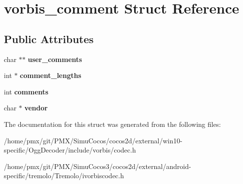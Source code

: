 \hypertarget{structvorbis__comment}{}\section{vorbis\+\_\+comment Struct Reference}
\label{structvorbis__comment}
\subsection*{Public Attributes}
\begin{DoxyCompactItemize}
\item 
\mbox{\label{structvorbis__comment_a9e36acca53d6be43e8218fb9ee49d850}} 
char $\ast$$\ast$ {\bfseries user\+\_\+comments}
\item 
\mbox{\label{structvorbis__comment_a91e786c2110af999dba5538b7b5cb04c}} 
int $\ast$ {\bfseries comment\+\_\+lengths}
\item 
\mbox{\label{structvorbis__comment_aa338208fb0f485b3818832a7d07dbe92}} 
int {\bfseries comments}
\item 
\mbox{\label{structvorbis__comment_ab2646bee68d539413329b8eead133d35}} 
char $\ast$ {\bfseries vendor}
\end{DoxyCompactItemize}


The documentation for this struct was generated from the following files\+:\begin{DoxyCompactItemize}
\item 
/home/pmx/git/\+P\+M\+X/\+Simu\+Cocos/cocos2d/external/win10-\/specific/\+Ogg\+Decoder/include/vorbis/codec.\+h\item 
/home/pmx/git/\+P\+M\+X/\+Simu\+Cocos3/cocos2d/external/android-\/specific/tremolo/\+Tremolo/ivorbiscodec.\+h\end{DoxyCompactItemize}
